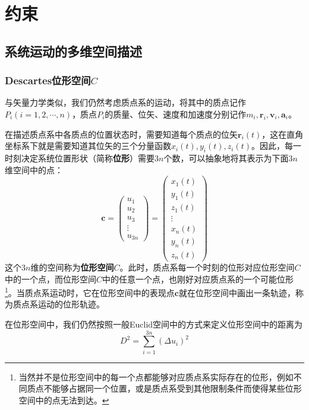 \chapter{约束}

\section{系统运动的多维空间描述}

\subsection{Descartes位形空间$C$}

与矢量力学类似，我们仍然考虑质点系的运动，将其中的质点记作$P_i(i=1,2,\cdots,n)$，质点$P_i$的质量、位矢、速度和加速度分别记作$m_i, \boldsymbol{r}_i, \boldsymbol{v}_i, \boldsymbol{a}_i$。

在描述质点系中各质点的位置状态时，需要知道每个质点的位矢$\boldsymbol{r}_i(t)$，这在直角坐标系下就是需要知道其位矢的三个分量函数$x_i(t), y_i(t), z_i(t)$。因此，每一时刻决定系统位置形状（简称{\bf 位形}）需要$3n$个数，可以抽象地将其表示为下面$3n$维空间中的点：
\begin{equation}
    \boldsymbol{c} = \begin{pmatrix}
        u_1 \\ u_2 \\ u_3 \\ \vdots \\ u_{3n}
    \end{pmatrix} = \begin{pmatrix}
        x_1(t) \\ y_1(t) \\ z_1(t) \\ \vdots \\ x_n(t) \\ y_n(t) \\ z_n(t)
    \end{pmatrix}
\end{equation}
这个$3n$维的空间称为{\bf 位形空间}$C$。此时，质点系每一个时刻的位形对应位形空间$C$中的一个点，而位形空间$C$中的任意一个点，也刚好对应质点系的一个可能位形\footnote{当然并不是位形空间中的每一个点都能够对应质点系实际存在的位形，例如不同质点不能够占据同一个位置，或是质点系受到其他限制条件而使得某些位形空间中的点无法到达。}。当质点系运动时，它在位形空间中的表现点$\boldsymbol{c}$就在位形空间中画出一条轨迹，称为质点系运动的位形轨迹。

在位形空间中，我们仍然按照一般Euclid空间中的方式来定义位形空间中的距离为
\begin{equation}
    D^2 = \sum_{i=1}^{3n} (\Delta u_i)^2
\end{equation}

